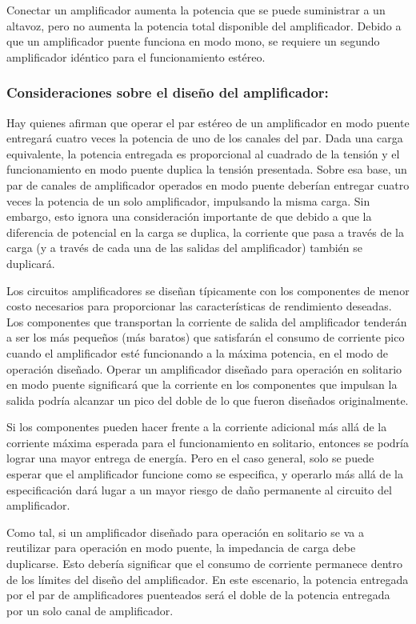 \documentclass[../main.tex]{subfiles}
\begin{document}
		Conectar un amplificador aumenta la potencia que se puede suministrar a un 
		altavoz, pero no aumenta la potencia total disponible del amplificador. Debido a 
		que un amplificador puente funciona en modo mono, se requiere un segundo 
		amplificador idéntico para el funcionamiento estéreo. 

		\subsubsection{Consideraciones sobre el diseño del amplificador:}
		Hay quienes afirman que operar el par estéreo de un amplificador en modo puente 
		entregará cuatro veces la potencia de uno de los canales del par. Dada una carga 
		equivalente, la potencia entregada es proporcional al cuadrado de la tensión y el 
		funcionamiento en modo puente duplica la tensión presentada. Sobre esa base, un 
		par de canales de amplificador operados en modo puente deberían entregar cuatro 
		veces la potencia de un solo amplificador, impulsando la misma carga. Sin embargo, 
		esto ignora una consideración importante de que debido a que la diferencia de 
		potencial en la carga se duplica, la corriente que pasa a través de la carga (y a 
		través de cada una de las salidas del amplificador) también se duplicará.

		Los circuitos amplificadores se diseñan típicamente con los componentes de menor 
		costo necesarios para proporcionar las características de rendimiento deseadas. 
		Los componentes que transportan la corriente de salida del amplificador tenderán a 
		ser los más pequeños (más baratos) que satisfarán el consumo de corriente pico 
		cuando el amplificador esté funcionando a la máxima potencia, en el modo de 
		operación diseñado. Operar un amplificador diseñado para operación en solitario en 
		modo puente significará que la corriente en los componentes que impulsan la salida 
		podría alcanzar un pico del doble de lo que fueron diseñados originalmente.

		Si los componentes pueden hacer frente a la corriente adicional más allá de la 
		corriente máxima esperada para el funcionamiento en solitario, entonces se podría 
		lograr una mayor entrega de energía. Pero en el caso general, solo se puede 
		esperar que el amplificador funcione como se especifica, y operarlo más allá de la 
		especificación dará lugar a un mayor riesgo de daño permanente al circuito del 
		amplificador.

		Como tal, si un amplificador diseñado para operación en solitario se va a 
		reutilizar para operación en modo puente, la impedancia de carga debe duplicarse. 
		Esto debería significar que el consumo de corriente permanece dentro de los 
		límites del diseño del amplificador. En este escenario, la potencia entregada por 
		el par de amplificadores puenteados será el doble de la potencia entregada por un 
		solo canal de amplificador.
\end{document}

